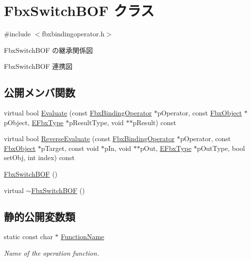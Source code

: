 \hypertarget{class_fbx_switch_b_o_f}{}\section{Fbx\+Switch\+B\+OF クラス}
\label{class_fbx_switch_b_o_f}


{\ttfamily \#include $<$fbxbindingoperator.\+h$>$}



Fbx\+Switch\+B\+OF の継承関係図


Fbx\+Switch\+B\+OF 連携図
\subsection*{公開メンバ関数}
\begin{DoxyCompactItemize}
\item 
virtual bool \hyperlink{class_fbx_switch_b_o_f_aa6cb2b6d6b4b03849efc885c86152e2e}{Evaluate} (const \hyperlink{class_fbx_binding_operator}{Fbx\+Binding\+Operator} $\ast$p\+Operator, const \hyperlink{class_fbx_object}{Fbx\+Object} $\ast$p\+Object, \hyperlink{fbxpropertytypes_8h_a73913a5ddfb20e57c6f25e9e6784bd92}{E\+Fbx\+Type} $\ast$p\+Result\+Type, void $\ast$$\ast$p\+Result) const
\item 
virtual bool \hyperlink{class_fbx_switch_b_o_f_af48ca495a335e415853ec0c5269867a6}{Reverse\+Evaluate} (const \hyperlink{class_fbx_binding_operator}{Fbx\+Binding\+Operator} $\ast$p\+Operator, const \hyperlink{class_fbx_object}{Fbx\+Object} $\ast$p\+Target, const void $\ast$p\+In, void $\ast$$\ast$p\+Out, \hyperlink{fbxpropertytypes_8h_a73913a5ddfb20e57c6f25e9e6784bd92}{E\+Fbx\+Type} $\ast$p\+Out\+Type, bool set\+Obj, int index) const
\item 
\hyperlink{class_fbx_switch_b_o_f_a1f71ba02ab3cb9e5b9aad176406b87d5}{Fbx\+Switch\+B\+OF} ()
\item 
virtual \hyperlink{class_fbx_switch_b_o_f_ae3abd0bfde3d20c9f34b9705a1ab0f53}{$\sim$\+Fbx\+Switch\+B\+OF} ()
\end{DoxyCompactItemize}
\subsection*{静的公開変数類}
\begin{DoxyCompactItemize}
\item 
static const char $\ast$ \hyperlink{class_fbx_switch_b_o_f_a5d39c1526096c35b43cb93759270df40}{Function\+Name}
\begin{DoxyCompactList}\small\item\em Name of the operation function. \end{DoxyCompactList}\end{DoxyCompactItemize}


